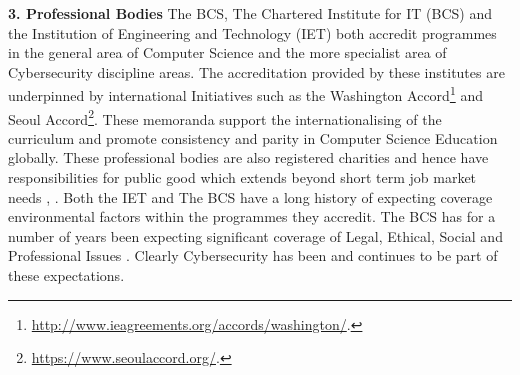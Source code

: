 \documentclass[sigconf,anonymous]{acmart}
\begin{document}
\textbf{3. Professional Bodies}
The BCS, The Chartered Institute for IT (BCS) and the Institution of Engineering and Technology (IET) both accredit programmes in the general area of Computer Science and the more specialist area of Cybersecurity discipline areas. The accreditation provided by these institutes are underpinned by international Initiatives such as the Washington Accord\footnote{\url{http://www.ieagreements.org/accords/washington/}.} and Seoul Accord\footnote{\url{https://www.seoulaccord.org/}.}. These memoranda support the internationalising of the curriculum and promote consistency and parity in Computer Science Education globally.   These professional bodies are also registered charities and hence have responsibilities for public good which extends beyond short term job market needs \cite{Stensaker2006}, \cite{Mutereko2017}. Both the IET and The BCS have a long history of expecting coverage environmental factors within the programmes they accredit. The BCS has for a number of years been expecting significant coverage of Legal, Ethical, Social and Professional Issues \cite{Brooke2018}. Clearly Cybersecurity has been and continues to be part of these expectations. 
\end{document}
